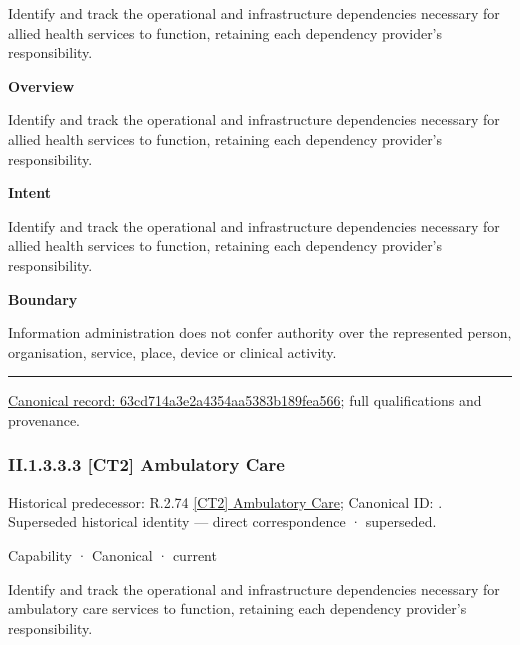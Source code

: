 Identify and track the operational and infrastructure dependencies necessary for allied health services to function, retaining each dependency provider's responsibility.



\textbf{Overview}



Identify and track the operational and infrastructure dependencies necessary for allied health services to function, retaining each dependency provider's responsibility.



\textbf{Intent}



Identify and track the operational and infrastructure dependencies necessary for allied health services to function, retaining each dependency provider's responsibility.



\textbf{Boundary}



Information administration does not confer authority over the represented person, organisation, service, place, device or clinical activity.



\medskip\hrule\medskip

{\footnotesize \href{../../../../continuum/strategy/capability/63cd714a3e2a4354aa5383b189fea566.md}{Canonical record: 63cd714a3e2a4354aa5383b189fea566}; full qualifications and provenance.}\par
\subsubsection*{II.1.3.3.3 [CT2] Ambulatory Care}
\label{navigation:II.1.3.3.3}

{\small Historical predecessor: R.2.74 \hyperref[element:e996b61b6e7b4619913f427aed2b55b1]{[CT2] Ambulatory Care}; Canonical ID: \texttt{}. Superseded historical identity — direct correspondence · superseded.}\par
\label{element:f74d7c3a39c540c4b462576e8f09fc58}
{\small Capability · Canonical · current}\par

Identify and track the operational and infrastructure dependencies necessary for ambulatory care services to function, retaining each dependency provider's responsibility.



